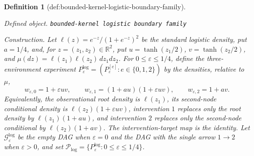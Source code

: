 \documentclass{article}
\newtheorem{definition}{Definition}
\begin{document}
\begin{definition}[def:bounded-kernel-logistic-boundary-family]\label{def:bounded-kernel-logistic-boundary-family}
\par\smallskip\noindent\emph{Defined object.} \texttt{bounded-\allowbreak{}kernel logistic boundary family}
\par\smallskip\noindent\emph{Construction.} Let \(\ell(z)=e^{-z}/(1+e^{-z})^2\) be the standard logistic density, put \(a=1/4\), and, for \(z=(z_1,z_2)\in\mathbb R^2\), put \(u=\tanh(z_1/2)\), \(v=\tanh(z_2/2)\), and \(\mu(dz)=\ell(z_1)\ell(z_2)\,dz_1dz_2\).  For \(0\le\varepsilon\le1/4\), define the three-environment experiment \(P_{\varepsilon}^{\mathrm{log}}=(P_{\varepsilon}^{[e]}:e\in\{0,1,2\})\) by the densities, relative to \(\mu\),
\[
 w_{\varepsilon,0}=1+\varepsilon uv,\qquad
 w_{\varepsilon,1}=(1+au)(1+\varepsilon uv),\qquad
 w_{\varepsilon,2}=1+av.
\]
Equivalently, the observational root density is \(\ell(z_1)\), its second-node conditional density is \(\ell(z_2)(1+\varepsilon uv)\), intervention \(1\) replaces only the root density by \(\ell(z_1)(1+au)\), and intervention \(2\) replaces only the second-node conditional by \(\ell(z_2)(1+av)\).  The intervention-target map is the identity.  Let \(\mathcal G_{\varepsilon}^{\mathrm{log}}\) be the empty DAG when \(\varepsilon=0\) and the DAG with the single arrow \(1\to2\) when \(\varepsilon>0\), and set \(\mathcal P_{\mathrm{log}}=\{P_{\varepsilon}^{\mathrm{log}}:0\le\varepsilon\le1/4\}\).


\end{definition}
\end{document}
